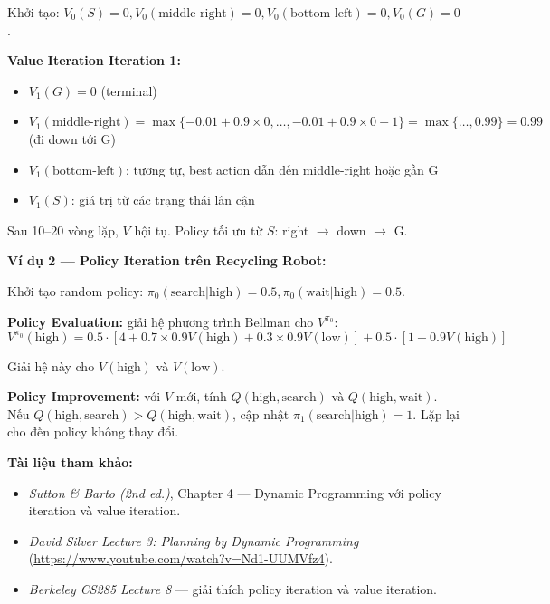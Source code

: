 \documentclass[12pt,a4paper]{article}
\begin{document}
Khởi tạo: $V_0(S)=0, V_0(\text{middle-right})=0, V_0(\text{bottom-left})=0, V_0(G)=0$.

\textbf{Value Iteration Iteration 1:}
\begin{itemize}[leftmargin=1.5em]
    \item $V_1(G) = 0$ (terminal)
    \item $V_1(\text{middle-right}) = \max\{-0.01 + 0.9 \times 0, \ldots, -0.01 + 0.9 \times 0 + 1\} = \max\{\ldots, 0.99\} = 0.99$ (đi down tới G)
    \item $V_1(\text{bottom-left})$: tương tự, best action dẫn đến middle-right hoặc gần G
    \item $V_1(S)$: giá trị từ các trạng thái lân cận
\end{itemize}

Sau 10--20 vòng lặp, $V$ hội tụ. Policy tối ưu từ $S$: right $\to$ down $\to$ G.

\textbf{Ví dụ 2 --- Policy Iteration trên Recycling Robot:}

Khởi tạo random policy: $\pi_0(\text{search}|\text{high})=0.5, \pi_0(\text{wait}|\text{high})=0.5$.

\textbf{Policy Evaluation:} giải hệ phương trình Bellman cho $V^{\pi_0}$:
\begin{equation}
V^{\pi_0}(\text{high}) = 0.5 \cdot [4 + 0.7 \times 0.9 V(\text{high}) + 0.3 \times 0.9 V(\text{low})] + 0.5 \cdot [1 + 0.9 V(\text{high})]
\end{equation}

Giải hệ này cho $V(\text{high})$ và $V(\text{low})$.

\textbf{Policy Improvement:} với $V$ mới, tính $Q(\text{high}, \text{search})$ và $Q(\text{high}, \text{wait})$. Nếu $Q(\text{high}, \text{search}) > Q(\text{high}, \text{wait})$, cập nhật $\pi_1(\text{search}|\text{high})=1$. Lặp lại cho đến policy không thay đổi.

\textbf{Tài liệu tham khảo:}
\begin{itemize}[leftmargin=1.5em]
    \item \textit{Sutton \& Barto (2nd ed.)}, Chapter 4 --- Dynamic Programming với policy iteration và value iteration.
    \item \textit{David Silver Lecture 3: Planning by Dynamic Programming} (\url{https://www.youtube.com/watch?v=Nd1-UUMVfz4}).
    \item \textit{Berkeley CS285 Lecture 8} --- giải thích policy iteration và value iteration.
\end{itemize}
\end{document}
